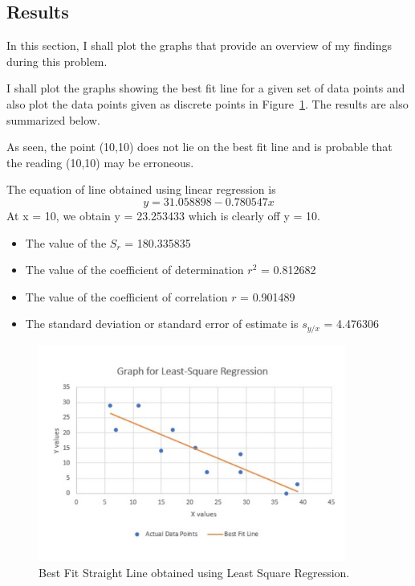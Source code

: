 \documentclass[titlepage, 11pt]{article}
\begin{document}
\subsection{Results}

In this section, I shall plot the graphs that provide an overview of my findings during this problem. 

I shall plot the graphs showing the best fit line for a given set of data points and also plot the data points given as discrete points  in Figure~\ref{fig:q11}. The results are also summarized below. 

As seen, the point (10,10) does not lie on the best fit line and is probable that the reading (10,10) may be erroneous. 

The equation of line obtained using linear regression is 
\begin{equation}
    y = 31.058898 - 0.780547 x
\end{equation}
At x = 10, we obtain y = 23.253433 which is clearly off y = 10. 
\begin{itemize}
\item [1] The value of the $S_r$ = 180.335835 
\item [2] The value of the coefficient of determination $r^2$ = 0.812682 
\item [3] The value of the coefficient of correlation $r$ = 0.901489
\item [4] The standard deviation or standard error of estimate is $s_{y/x}$ = 4.476306 
\end{itemize}
\begin{figure}[!tbh]
  	\centering
  	\includegraphics[width=0.9\textwidth]{A5P1Graph.pdf} 
  	\caption{Best Fit Straight Line obtained using Least Square Regression.}
  	\label{fig:q11} 
\end{figure}
\end{document}
